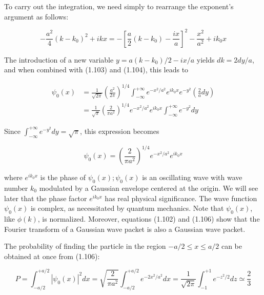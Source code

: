 \documentclass[10pt]{article}
\begin{document}
To carry out the integration, we need simply to rearrange the exponent's argument as follows:


\begin{equation*}
-\frac{a^{2}}{4}\left(k-k_{0}\right)^{2}+i k x=-\left[\frac{a}{2}\left(k-k_{0}\right)-\frac{i x}{a}\right]^{2}-\frac{x^{2}}{a^{2}}+i k_{0} x \tag{1.104}
\end{equation*}


The introduction of a new variable $y=a\left(k-k_{0}\right) / 2-i x / a$ yields $d k=2 d y / a$, and when combined with (1.103) and (1.104), this leads to


\begin{align*}
\psi_{0}(x) & =\frac{1}{\sqrt{2 \pi}}\left(\frac{a^{2}}{2 \pi}\right)^{1 / 4} \int_{-\infty}^{+\infty} e^{-x^{2} / a^{2}} e^{i k_{0} x} e^{-y^{2}}\left(\frac{2}{a} d y\right) \\
& =\frac{1}{\sqrt{\pi}}\left(\frac{2}{\pi a^{2}}\right)^{1 / 4} e^{-x^{2} / a^{2}} e^{i k_{0} x} \int_{-\infty}^{+\infty} e^{-y^{2}} d y \tag{1.105}
\end{align*}


Since $\int_{-\infty}^{+\infty} e^{-y^{2}} d y=\sqrt{\pi}$, this expression becomes


\begin{equation*}
\psi_{0}(x)=\left(\frac{2}{\pi a^{2}}\right)^{1 / 4} e^{-x^{2} / a^{2}} e^{i k_{0} x} \tag{1.106}
\end{equation*}


where $e^{i k_{0} x}$ is the phase of $\psi_{0}(x) ; \psi_{0}(x)$ is an oscillating wave with wave number $k_{0}$ modulated by a Gaussian envelope centered at the origin. We will see later that the phase factor $e^{i k_{0} x}$ has real physical significance. The wave function $\psi_{0}(x)$ is complex, as necessitated by quantum mechanics. Note that $\psi_{0}(x)$, like $\phi(k)$, is normalized. Moreover, equations (1.102) and (1.106) show that the Fourier transform of a Gaussian wave packet is also a Gaussian wave packet.

The probability of finding the particle in the region $-a / 2 \leq x \leq a / 2$ can be obtained at once from (1.106):


\begin{equation*}
P=\int_{-a / 2}^{+a / 2}\left|\psi_{0}(x)\right|^{2} d x=\sqrt{\frac{2}{\pi a^{2}}} \int_{-a / 2}^{+a / 2} e^{-2 x^{2} / a^{2}} d x=\frac{1}{\sqrt{2 \pi}} \int_{-1}^{+1} e^{-z^{2} / 2} d z \simeq \frac{2}{3} \tag{1.107}
\end{equation*}
\end{document}
